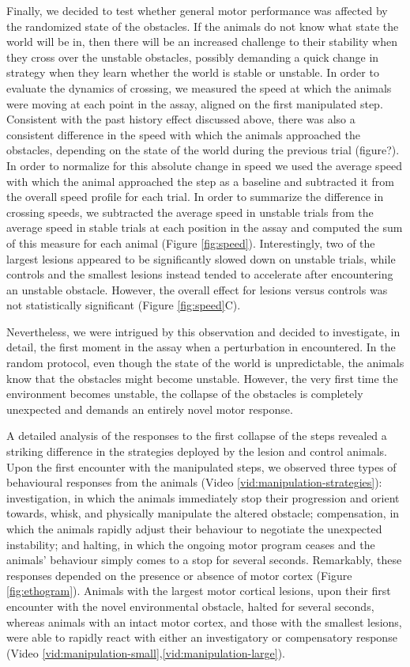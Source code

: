 Finally, we decided to test whether general motor performance was affected by the randomized state of the obstacles. If the animals do not know what state the world will be in, then there will be an increased challenge to their stability when they cross over the unstable obstacles, possibly demanding a quick change in strategy when they learn whether the world is stable or unstable. In order to evaluate the dynamics of crossing, we measured the speed at which the animals were moving at each point in the assay, aligned on the first manipulated step. Consistent with the past history effect discussed above, there was also a consistent difference in the speed with which the animals approached the obstacles, depending on the state of the world during the previous trial (figure?). In order to normalize for this absolute change in speed we used the average speed with which the animal approached the step as a baseline and subtracted it from the overall speed profile for each trial. In order to summarize the difference in crossing speeds, we subtracted the average speed in unstable trials from the average speed in stable trials at each position in the assay and computed the sum of this measure for each animal (Figure \ref{fig:speed}). Interestingly, two of the largest lesions appeared to be significantly slowed down on unstable trials, while controls and the smallest lesions instead tended to accelerate after encountering an unstable obstacle. However, the overall effect for lesions versus controls was not statistically significant (Figure \ref{fig:speed}C).

Nevertheless, we were intrigued by this observation and decided to investigate, in detail, the first moment in the assay when a perturbation in encountered. In the random protocol, even though the state of the world is unpredictable, the animals know that the obstacles might become unstable. However, the very first time the environment becomes unstable, the collapse of the obstacles is completely unexpected and demands an entirely novel motor response.

A detailed analysis of the responses to the first collapse of the steps revealed a striking difference in the strategies deployed by the lesion and control animals. Upon the first encounter with the manipulated steps, we observed three types of behavioural responses from the animals (Video \ref{vid:manipulation-strategies}): investigation, in which the animals immediately stop their progression and orient towards, whisk, and physically manipulate the altered obstacle; compensation, in which the animals rapidly adjust their behaviour to negotiate the unexpected instability; and halting, in which the ongoing motor program ceases and the animals' behaviour simply comes to a stop for several seconds. Remarkably, these responses depended on the presence or absence of motor cortex (Figure \ref{fig:ethogram}). Animals with the largest motor cortical lesions, upon their first encounter with the novel environmental obstacle, halted for several seconds, whereas animals with an intact motor cortex, and those with the smallest lesions, were able to rapidly react with either an investigatory or compensatory response (Video \ref{vid:manipulation-small},\ref{vid:manipulation-large}).

